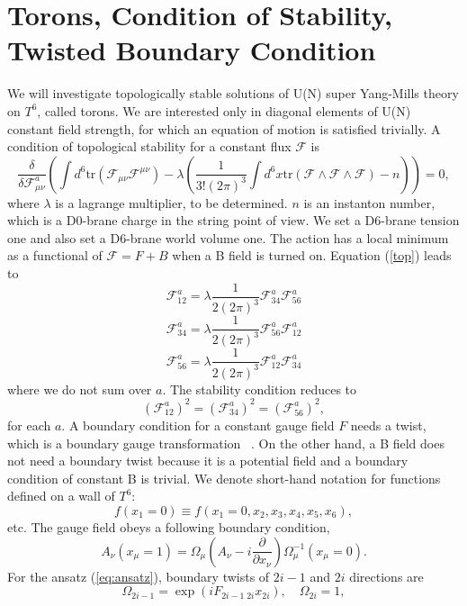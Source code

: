 \documentclass[a4paper,12pt]{article}
\newcommand{\tr}{\mbox{tr}}
\begin{document}
\section{Torons, Condition of Stability, Twisted Boundary Condition}
We will investigate topologically stable solutions of U(N) super Yang-Mills theory on $T^6$, called torons. We are interested only in diagonal elements of U(N) constant field strength, for which an equation of motion is satisfied trivially. A condition of topological stability for a constant flux $\mathcal{F}$ is ~\cite{taylor}
\begin{equation}
\frac{\delta}{\delta \mathcal{F}_{\mu \nu}^a}(\int d^6 \tr(\mathcal{F}_{\mu \nu}\mathcal{F}^{\mu \nu})-\lambda( \frac{1}{3!(2\pi)^3}\int d^6x \tr(\mathcal{F} \wedge \mathcal{F} \wedge \mathcal{F})-n))=0, \label{top}
\end{equation}
where $\lambda$ is a lagrange multiplier, to be determined. $n$ is an instanton number, which is a D0-brane charge in the string point of view. We set a D6-brane tension one and also set a D6-brane world volume one. The action has a local minimum as a functional of $\mathcal{F} =  F + B $ when a B field is turned on. Equation (\ref{top}) leads to 
\[\mathcal{F}_{12}^a = \lambda \frac{1}{2(2\pi)^3}\mathcal{F}_{34}^a\mathcal{F}_{56}^a \]  
\[\mathcal{F}_{34}^a = \lambda \frac{1}{2(2\pi)^3}\mathcal{F}_{56}^a\mathcal{F}_{12}^a \]  
\[\mathcal{F}_{56}^a = \lambda \frac{1}{2(2\pi)^3}\mathcal{F}_{12}^a\mathcal{F}_{34}^a \] 
where we do not sum over $a$.
The stability condition reduces to
\begin{equation}
(\mathcal{F}_{12}^a)^2=(\mathcal{F}_{34}^a)^2=(\mathcal{F}_{56}^a)^2, \label{eq:stability}
\end{equation} 
for each $a$. A boundary condition for a constant gauge field $F$ needs a twist, which is a boundary gauge transformation ~\cite{thooft}. On the other hand, a B field does not need a boundary twist because it is a potential field and a boundary condition of constant B is trivial. We denote short-hand notation for functions defined on a wall of $T^6$:
\begin{equation}
f(x_1=0) \equiv f(x_1=0,x_2,x_3,x_4,x_5,x_6),
\end{equation}
etc. The gauge field obeys a following boundary condition,
\[A_\nu(x_\mu=1)= \Omega_\mu(A_\nu-i\frac{\partial}{\partial x_\nu})\Omega_\mu^{-1}(x_\mu=0). \] 
For the ansatz (\ref{eq:ansatz}), boundary twists of $2i-1$ and $2i$ directions are  
\[\Omega_{2i-1} = \exp(iF_{2i-1 \; 2i}x_{2i}), \quad \Omega_{2i}=1,\]
\end{document}
